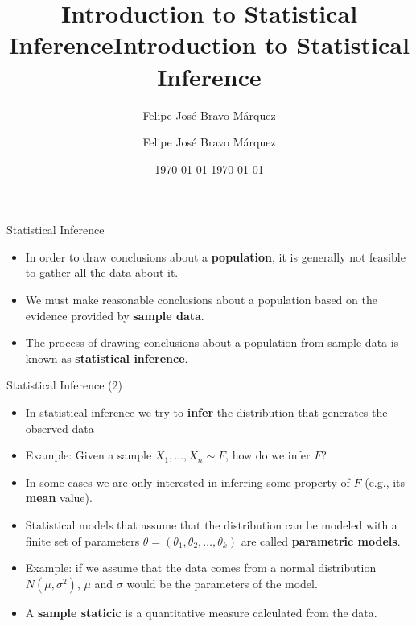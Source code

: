\documentclass[handout]{beamer}
\title{Introduction to Statistical Inference}
\author[Felipe Bravo Márquez]{\footnotesize
 \textcolor[rgb]{0.00,0.00,1.00}{Felipe José Bravo Márquez}}
\date{ \today }
\title{Introduction to Statistical Inference}
\author[Felipe Bravo Márquez]{\footnotesize
 \textcolor[rgb]{0.00,0.00,1.00}{Felipe José Bravo Márquez}}
\date{ \today }
\begin{document}
\begin{frame}
\titlepage


\end{frame}




\begin{frame}{Statistical Inference}
\scriptsize{
\begin{itemize}
 \item In order to draw conclusions about a \textbf{population}, it is generally not feasible to gather all the data about it.
 \item We must make reasonable conclusions about a population based on the evidence provided by \textbf{sample data}.
 \item The process of drawing conclusions about a population from sample data is known as \textbf{statistical inference}.
\end{itemize}

} 
\end{frame}


\begin{frame}{Statistical Inference (2)}
\scriptsize{
\begin{itemize}
\item In statistical inference we try to \textbf{infer} the distribution that generates the observed data
\item Example: Given a sample $X_1, \dots, X_n \sim F$, how do we infer $F$? 
\item In some cases we are only interested in inferring some property of $F$ (e.g., its \textbf{mean} value).
\item Statistical models that assume that the distribution can be modeled with a finite set of parameters $\theta= (\theta_{1},\theta_{2},\dots,\theta_{k})$ are called \textbf{parametric models}. 
\item Example: if we assume that the data comes from a normal distribution $N(\mu,\sigma^2)$, $\mu$ and $\sigma$ would be the parameters of the model. 
\item A \textbf{sample staticic} is a quantitative measure calculated from the data.
\end{itemize}


} 
\end{frame}
\end{document}
